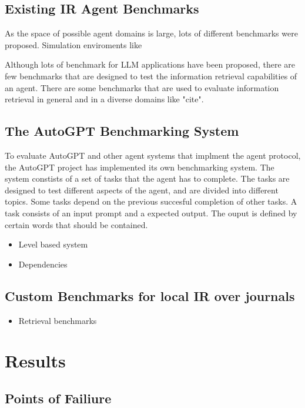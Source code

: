 \documentclass[english, version-2022-01]{uzl-thesis}
\begin{document}
\section{Existing IR Agent Benchmarks}

As the space of possible agent domains is large, lots of different benchmarks were proposed. Simulation enviroments like

Although lots of benchmark for LLM applications have been proposed, there are few benchmarks that are designed to test the information retrieval capabilities of an agent. There are some benchmarks that are used to evaluate information retrieval in general and in a diverse domains like "cite".

\section{The AutoGPT Benchmarking System}

To evaluate AutoGPT and other agent systems that implment the agent protocol, the AutoGPT project has implemented its own benchmarking system. The system constists of a set of tasks that the agent has to complete. The tasks are designed to test different aspects of the agent, and are divided into different topics. Some tasks depend on the previous succesful completion of other tasks. A task consists of an input prompt and a expected output. The ouput is defined by certain words that should be contained.

\begin{itemize}
	\item Level based system
	\item Dependencies
\end{itemize}

\section{Custom Benchmarks for local IR over journals}

\begin{itemize}
	\item Retrieval benchmarks
\end{itemize}

\chapter{Results}

\section{Points of Failiure}
\end{document}

